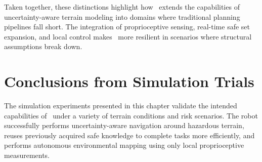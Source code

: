 Taken together, these distinctions highlight how \algoname\ extends the capabilities of uncertainty-aware terrain modeling into domains where traditional planning pipelines fall short. The integration of proprioceptive sensing, real-time safe set expansion, and local control makes \algoname\ more resilient in scenarios where structural assumptions break down.


\section{Conclusions from Simulation Trials}

The simulation experiments presented in this chapter validate the intended capabilities of \algoname\ under a variety of terrain conditions and risk scenarios. The robot successfully performs uncertainty-aware navigation around hazardous terrain, reuses previously acquired safe knowledge to complete tasks more efficiently, and performs autonomous environmental mapping using only local proprioceptive measurements.